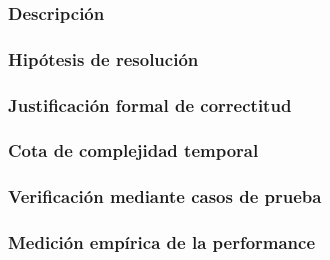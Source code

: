 \documentclass[11pt, a4paper, twoside]{article}
\begin{document}
{}

\subsubsection{Descripción}

\subsubsection{Hipótesis de resolución}

\subsubsection{Justificación formal de correctitud}

\subsubsection{Cota de complejidad temporal}

\subsubsection{Verificación mediante casos de prueba}

\subsubsection{Medición empírica de la performance}

\end{document}
